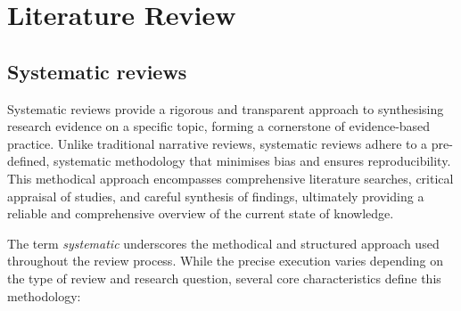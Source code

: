 \documentclass[10pt,oneside]{book}
\begin{document}
\chapter{Literature Review}

\section{Systematic reviews}

Systematic reviews provide a rigorous and transparent approach to synthesising research evidence on a specific topic, forming a cornerstone of evidence-based practice. Unlike traditional narrative reviews, systematic reviews adhere to a pre-defined, systematic methodology that minimises bias and ensures reproducibility. This methodical approach encompasses comprehensive literature searches, critical appraisal of studies, and careful synthesis of findings, ultimately providing a reliable and comprehensive overview of the current state of knowledge.

The term \emph{systematic} underscores the methodical and structured approach used throughout the review process. While the precise execution varies depending on the type of review and research question, several core characteristics define this methodology:
\end{document}
